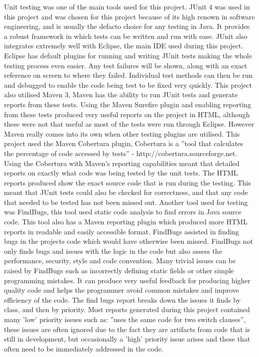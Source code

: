 \documentclass[12pt]{article}
\begin{document}
Unit testing was one of the main tools used for this project. JUnit 4 was used in this project and was chosen for this project because
of its high renown in software engineering, and is usually the defacto choice for any testing in Java. It provides a robust framework
in which tests can be written and run with ease. JUnit also integrates extremely well with Eclipse, the main IDE used during this project. Eclipse has default plugins for running and writing JUnit tests making the whole testing process even easier. Any test
failures will be shown, along with an exact reference on screen to where they failed. Individual test methods can then be run and
debugged to enable the code being test to be fixed very quickly.
This project also utilised Maven 3, Maven has the ability to run JUnit tests and generate reports from these tests. Using the Maven
Surefire plugin and enabling reporting from these tests produced very useful reports on the project in HTML, although these were not
that useful as most of the tests were run through Eclipse. However Maven really comes into its own when other testing plugins are
utilised. This project used the Maven Cobertura plugin, Cobertura is a ''tool that calculates the percentage of code accessed by 
tests'' - http://cobertura.sourceforge.net. Using the Cobertura with Maven's reporting capabilities meant that detailed reports
on exactly what code was being tested by the unit tests. The HTML reports produced show the exact source code that is run during the
testing. This meant that JUnit tests could also be checked for correctness, and that any code that needed to be tested has not been
missed out.
Another tool used for testing was FindBugs, this tool used static code analysis to find errors in Java source code. This tool also
has a Maven reporting plugin which produced more HTML reports in readable and easily accessible format. FindBugs assisted in finding bugs in the projects code which would have otherwise been missed. FindBugs not only finds bugs and issues with the logic in the code
but also assess the performance, security, style and code convention. Many trivial issues can be raised by FindBugs such as 
incorrectly defining static fields or other simple programming mistakes. It can produce very useful feedback for producing
higher quality code and helps the programmer avoid common mistakes and improve efficiency of the code. The find bugs report breaks
down the issues it finds by class, and then by priority. Most reports generated during this project contained many 'low' priority
issues such as: ''uses the same code for two switch clauses'', these issues are often ignored due to the fact they are artifacts
from code that is still in development, but occasionally a 'high' priority issue arises and these that often need to be immediately
addressed in the code. 
\end{document}
